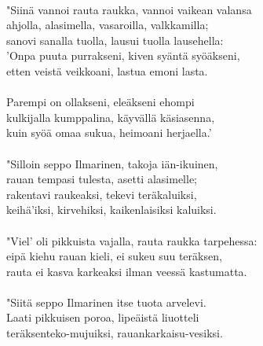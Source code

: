                                                                        \\
"Siinä vannoi rauta raukka, vannoi vaikean valansa                     \\
ahjolla, alasimella, vasaroilla, valkkamilla;                          \\
sanovi sanalla tuolla, lausui tuolla lausehella:                       \\
'Onpa puuta purrakseni, kiven syäntä syöäkseni,                        \\
etten veistä veikkoani, lastua emoni lasta.                            \\
                                                                       \\
Parempi on ollakseni, eleäkseni ehompi                                 \\
kulkijalla kumppalina, käyvällä käsiasenna,                            \\
kuin syöä omaa sukua, heimoani herjaella.'                             \\
                                                                       \\
"Silloin seppo Ilmarinen, takoja iän-ikuinen,                          \\
rauan tempasi tulesta, asetti alasimelle;                              \\
rakentavi raukeaksi, tekevi teräkaluiksi,                              \\
keihä'iksi, kirvehiksi, kaikenlaisiksi kaluiksi.                       \\
                                                                       \\
"Viel' oli pikkuista vajalla, rauta raukka tarpehessa:                 \\
eipä kiehu rauan kieli, ei sukeu suu teräksen,                         \\
rauta ei kasva karkeaksi ilman veessä kastumatta.                      \\
                                                                       \\
"Siitä seppo Ilmarinen itse tuota arvelevi.                            \\
Laati pikkuisen poroa, lipeäistä liuotteli                             \\
teräksenteko-mujuiksi, rauankarkaisu-vesiksi.                          \\
